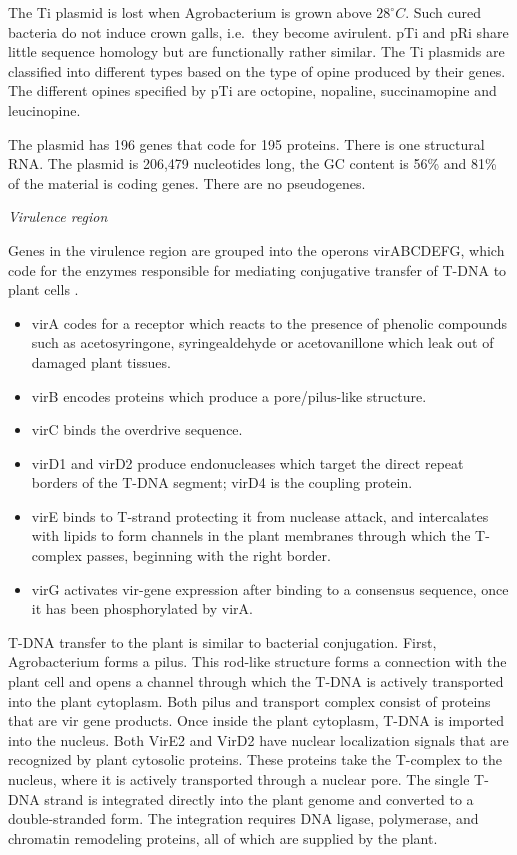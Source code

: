 \documentclass[nofonts,]{tufte-handout}
\providecommand{\tightlist}{%
  \setlength{\itemsep}{0pt}\setlength{\parskip}{0pt}}
\begin{document}
The Ti plasmid is lost when Agrobacterium is grown above \(28^\circ C\).
Such cured bacteria do not induce crown galls, i.e.~they become
avirulent. pTi and pRi share little sequence homology but are
functionally rather similar. The Ti plasmids are classified into
different types based on the type of opine produced by their genes. The
different opines specified by pTi are octopine, nopaline, succinamopine
and leucinopine.

The plasmid has 196 genes that code for 195 proteins. There is one
structural RNA. The plasmid is 206,479 nucleotides long, the GC content
is 56\% and 81\% of the material is coding genes. There are no
pseudogenes.

\emph{Virulence region}

Genes in the virulence region are grouped into the operons virABCDEFG,
which code for the enzymes responsible for mediating conjugative
transfer of T-DNA to plant cells \citep{stachel1986genetic}.

\begin{itemize}
\tightlist
\item
  virA codes for a receptor which reacts to the presence of phenolic
  compounds such as acetosyringone, syringealdehyde or acetovanillone
  which leak out of damaged plant tissues.
\item
  virB encodes proteins which produce a pore/pilus-like structure.
\item
  virC binds the overdrive sequence.
\item
  virD1 and virD2 produce endonucleases which target the direct repeat
  borders of the T-DNA segment; virD4 is the coupling protein.
\item
  virE binds to T-strand protecting it from nuclease attack, and
  intercalates with lipids to form channels in the plant membranes
  through which the T-complex passes, beginning with the right border.
\item
  virG activates vir-gene expression after binding to a consensus
  sequence, once it has been phosphorylated by virA.
\end{itemize}

T-DNA transfer to the plant is similar to bacterial conjugation. First,
Agrobacterium forms a pilus. This rod-like structure forms a connection
with the plant cell and opens a channel through which the T-DNA is
actively transported into the plant cytoplasm. Both pilus and transport
complex consist of proteins that are vir gene products. Once inside the
plant cytoplasm, T-DNA is imported into the nucleus. Both VirE2 and
VirD2 have nuclear localization signals that are recognized by plant
cytosolic proteins. These proteins take the T-complex to the nucleus,
where it is actively transported through a nuclear pore. The single
T-DNA strand is integrated directly into the plant genome and converted
to a double-stranded form. The integration requires DNA ligase,
polymerase, and chromatin remodeling proteins, all of which are supplied
by the plant.
\end{document}
